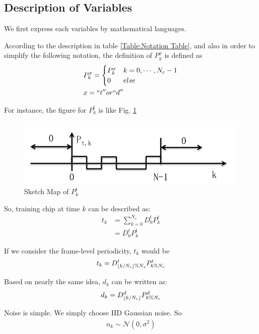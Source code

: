\documentclass[a4paper]{article}
\begin{document}
\subsection{Description of Variables} %
\label{sub:description_of_variables}
We first express each variables by mathematical languages.

According to the description in table \ref{Table:Notation Table}, and also in order to simplify the following notation, the definition of $P^x_y$ is defined as 
\begin{equation}
\begin{split}
	&P^x_k = 
	\begin{cases}
		P^x_k 	& k = 0, \cdots, N_c-1\\
		0 			& else
	\end{cases}\\
	&x = ``t'' or ``d''
\end{split}
\end{equation}

For instance, the figure for $P^t_k$ is like Fig. \ref{fig:Sketch Map of P_tk}
\begin{figure}
	\centering
	\includegraphics[width = 3.1 in]{figure/p_t_k.png}
	\caption{Sketch Map of $P^t_k$}
	\label{fig:Sketch Map of P_tk}
\end{figure}

So, training chip at time $k$ can be described as:
\begin{align}
		t_k 
	&= \sum_{k = 0}^{N_c} D^t_0 P^t_{k}\\
	&= D^t_0 P^t_k \label{eq:t_k only consider the cyclic property of symbol level}
\end{align}

If we consider the frame-level periodicity, $t_k$ would be
\begin{align}
	t_k = D^t_{\lfloor k / N_c\rfloor \% N_s} P^t_{k \% N_c}
\end{align}

Based on nearly the same idea, $d_k$ can be written as:
\begin{align}
	d_k = D^d_{\lfloor k / N_c\rfloor} P^d_{k \% N_c}
\end{align}

Noise is simple. We simply choose IID Gaussian noise. So
\begin{align}
	n_k \sim \mathcal{N}(0, \sigma^2)
\end{align}
\end{document}
